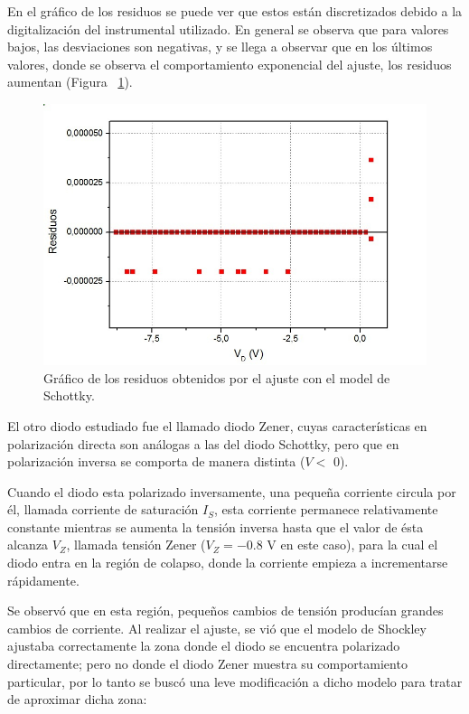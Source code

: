 \documentclass[twoside,twocolumn,a4paper]{article}
\begin{document}
En el gr\'afico de los residuos se puede ver que estos est\'an discretizados debido a la digitalizaci\'on del instrumental utilizado. En general se observa que para valores bajos, las desviaciones son negativas, y se llega a observar que en los \'ultimos valores, donde se observa el comportamiento exponencial del ajuste, los residuos aumentan (Figura ~\ref{fig:res}).

\begin{figure}[H]
\includegraphics[width=\linewidth]{residuos.jpg}
\captionsetup{justification=centering}
\caption{Gr\'afico de los residuos obtenidos por el ajuste con el model de Schottky.}
\label{fig:res}
\end{figure} 

El otro diodo estudiado fue el llamado diodo Zener, cuyas caracter\'isticas en polarizaci\'on directa son an\'alogas a las del diodo Schottky, pero que en polarizaci\'on inversa se comporta de manera distinta ($V <$ 0).


Cuando el diodo esta polarizado inversamente, una peque\~na corriente circula por \'el, llamada corriente de saturaci\'on $I_{S}$, esta corriente permanece relativamente constante mientras se aumenta la tensi\'on inversa hasta que el valor de \'esta alcanza $V_{Z}$, llamada tensi\'on Zener ($V_{Z} = - 0.8$ V en este caso), para la cual el diodo entra en la regi\'on de colapso, donde la corriente empieza a incrementarse r\'apidamente.

Se observ\'o que en esta regi\'on, peque\~nos cambios de tensi\'on produc\'ian grandes cambios de corriente. Al realizar el ajuste, se vi\'o que el modelo de Shockley ajustaba correctamente la zona donde el diodo se encuentra polarizado directamente; pero no donde el diodo Zener muestra su comportamiento particular, por lo tanto se busc\'o una leve modificaci\'on a dicho modelo para tratar de aproximar dicha zona:
\end{document}

